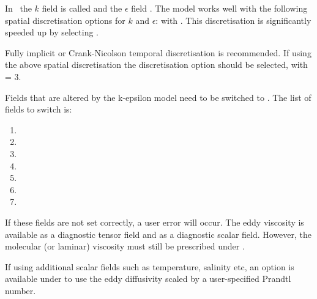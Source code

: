 In \fluidity\ the $k$ field is called  and the $\epsilon$ field .
The model works well with the following spatial discretisation options for $k$ and $\epsilon$: \linebreak
{} \linebreak
with .
This discretisation is significantly speeded up by selecting
 \linebreak
{}.

Fully implicit or Crank-Nicolson temporal discretisation is recommended.
If using the above spatial discretisation the
 discretisation option should be selected, with \linebreak
{} = 3.

Fields that are altered by the k-epsilon model need to be switched
to \linebreak {}. The list of fields to switch is:
\begin{enumerate}
\item {}
\item {}
\item {}
\item {}
\item {}
\item {}
\item {}
\end{enumerate}

If these fields are not set correctly, a user error will occur. The eddy viscosity is available as a diagnostic
tensor field and as a diagnostic scalar field. However, the molecular (or laminar) viscosity must still be prescribed under \linebreak
{}.

If using additional scalar fields such as temperature, salinity etc, an option is available under \linebreak
{} to use the eddy diffusivity scaled by a user-specified Prandtl number.

